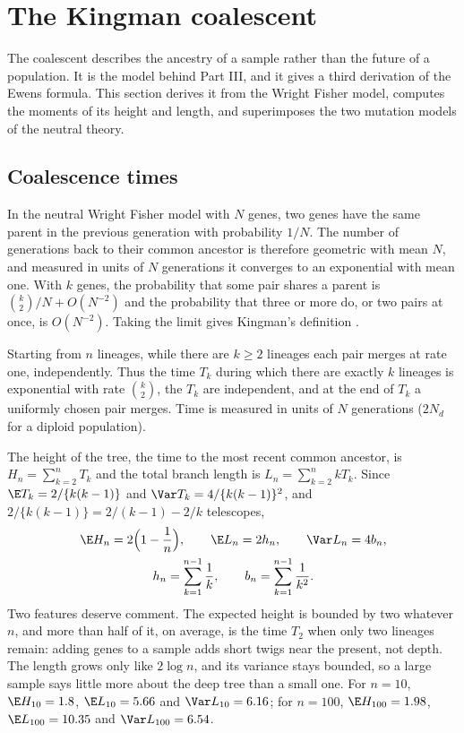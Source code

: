 \section{The Kingman coalescent}\label{toolkit:sec:coal}

The coalescent describes the ancestry of a sample rather than the future of a population. It is
the model behind Part III, and it gives a third derivation of the Ewens formula. This section
derives it from the Wright Fisher model, computes the moments of its height and length, and
superimposes the two mutation models of the neutral theory.

\subsection{Coalescence times}\label{toolkit:sec:coaltimes}

In the neutral Wright Fisher model with $N$ genes, two genes have the same parent in the previous
generation with probability $1/N$. The number of generations back to their common ancestor is
therefore geometric with mean $N$, and measured in units of $N$ generations it converges to an
exponential with mean one. With $k$ genes, the probability that some pair shares a parent is
$\binom k2/N+O(N^{-2})$ and the probability that three or more do, or two pairs at once, is
$O(N^{-2})$. Taking the limit gives Kingman's definition \citep{toolkit:kingman1982}.

\begin{definition}\label{toolkit:def:coal}
Starting from $n$ lineages, while there are $k\ge2$ lineages each pair merges at rate one,
independently. Thus the time $T_k$ during which there are exactly $k$ lineages is exponential
with rate $\binom k2$, the $T_k$ are independent, and at the end of $T_k$ a uniformly chosen pair
merges. Time is measured in units of $N$ generations ($2N_d$ for a diploid population).
\end{definition}

The height of the tree, the time to the most recent common ancestor, is $H_n=\sum_{k=2}^nT_k$ and
the total branch length is $L_n=\sum_{k=2}^nkT_k$. Since $\E T_k=2/\{k(k-1)\}$ and $\Var
T_k=4/\{k(k-1)\}^2$, and $2/\{k(k-1)\}=2/(k-1)-2/k$ telescopes,
\begin{equation}\label{toolkit:eq:HL}
\begin{gathered}
\E H_n=2\Big(1-\frac1n\Big),\qquad \E L_n=2h_n,\qquad \Var L_n=4b_n,\\
h_n=\sum_{k=1}^{n-1}\frac1k,\qquad b_n=\sum_{k=1}^{n-1}\frac1{k^2}.
\end{gathered}
\end{equation}
Two features deserve comment. The expected height is bounded by two whatever $n$, and more than half of it,
on average, is the time $T_2$ when only two lineages remain: adding genes to a sample adds short
twigs near the present, not depth. The length grows only like $2\log n$, and its variance stays
bounded, so a large sample says little more about the deep tree than a small one. For $n=10$,
$\E H_{10}=1.8$, $\E L_{10}=5.66$ and $\Var L_{10}=6.16$; for $n=100$, $\E H_{100}=1.98$,
$\E L_{100}=10.35$ and $\Var L_{100}=6.54$.

